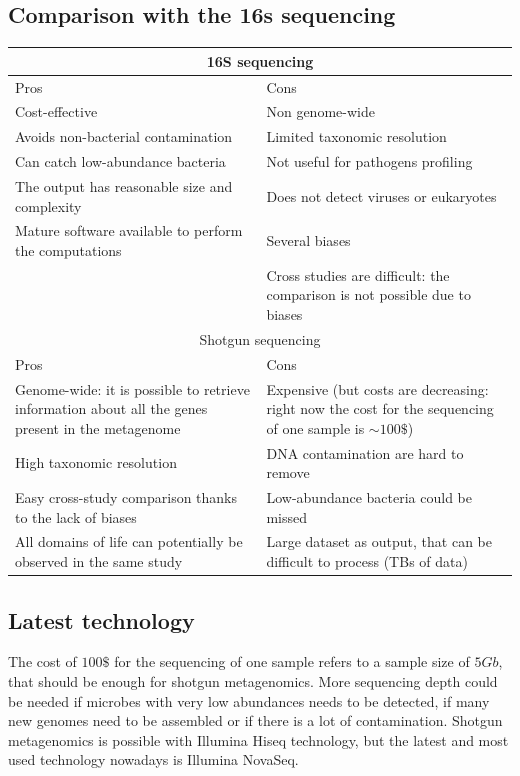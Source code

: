     \subsection{Comparison with the 16s sequencing}

    \begin{tabular}{ | m{7cm}| m{7cm} | }
     \hline
     \multicolumn{2}{|c|}{16S sequencing} \\
     \hline
     Pros & Cons \\
     \hline
     Cost-effective & Non genome-wide \\
     Avoids non-bacterial contamination & Limited taxonomic resolution \\
     Can catch low-abundance bacteria & Not useful for pathogens profiling \\
     The output has reasonable size and complexity & Does not detect viruses or eukaryotes \\
     Mature software available to perform the computations & Several biases\\
     & Cross studies are difficult: the comparison is not possible due to biases \\
     \hline\hline
     \multicolumn{2}{|c|}{Shotgun sequencing} \\
     \hline
     Pros & Cons \\
     \hline
     Genome-wide: it is possible to retrieve information about all the genes present in the metagenome & Expensive (but costs are decreasing: right now the cost for the sequencing of one sample is $\sim100\$$) \\
     High taxonomic resolution & DNA contamination are hard to remove \\
     Easy cross-study comparison thanks to the lack of biases & Low-abundance bacteria could be missed \\
     All domains of life can potentially be observed in the same study & Large dataset as output, that can be difficult to process (TBs of data) \\
     \hline
    \end{tabular}

    \subsection{Latest technology}
    The cost of $100\$$ for the sequencing of one sample refers to a sample size of $5Gb$, that should be enough for shotgun metagenomics.
    More sequencing depth could be needed if microbes with very low abundances needs to be detected, if many new genomes need to be assembled or if there is a lot of contamination.
    Shotgun metagenomics is possible with Illumina Hiseq technology, but the latest and most used technology nowadays is Illumina NovaSeq.


